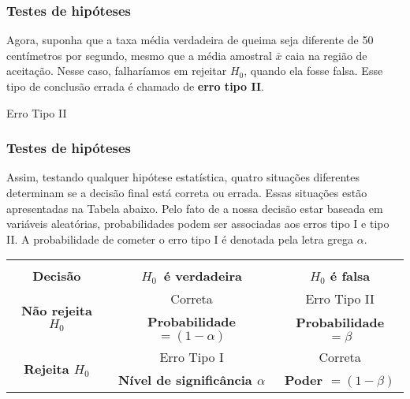 \documentclass[14pt,aspectratio=1610]{beamer}
\begin{document}
\begin{frame}{}
\frametitle{Testes de hipóteses}
\begin{block}{}
\justifying
Agora, suponha que a taxa média verdadeira de queima seja diferente de 50 centímetros por segundo, mesmo que a média amostral $\bar{x}$ caia na região de 
aceitação. Nesse caso, falharíamos em rejeitar $H_{0}$, quando ela fosse falsa. Esse tipo de conclusão errada é chamado de \textbf{erro tipo II}.
\end{block}
\pause
\begin{block}{Erro Tipo II}
\end{block}
\end{frame}

\begin{frame}{}
\frametitle{Testes de hipóteses}
\begin{block}{}
\justifying
Assim, testando qualquer hipótese estatística, quatro situações diferentes determinam se a decisão final está correta ou errada. Essas situações estão apresentadas 
na Tabela abaixo. Pelo fato de a nossa decisão estar baseada em variáveis aleatórias, probabilidades podem ser associadas aos erros tipo I e tipo II. A 
probabilidade de cometer o erro tipo I é denotada pela letra grega $\alpha$.
 \end{block}

\begin{block}{}
\begin{center}
\begin{table}[]
\begin{tabular}{c|c|c}
&&\\
                          \textbf{Decisão}                   &\textbf{$H_{0}\,$ é verdadeira}                         &\textbf{$H_{0}$ é falsa}\\ \hline
 \multirow{2}{*}{\textbf{Não rejeita $H_{0}$}}&Correta                                                               &Erro Tipo II\\
                                                                        &\textbf{Probabilidade $=\left(1-\alpha \right)$} &\textbf{Probabilidade $=\beta$}\\ \hline
\multirow{2}{*}{\textbf{Rejeita $H_{0}$}}       &Erro Tipo I                                                          &  Correta\\
                                                                        &\textbf{Nível de significância $\alpha$}            &\textbf{Poder $=\left( 1-\beta\right)$}\\ \hline
\end{tabular}
\end{table}
\end{center}
\end{block}

\end{frame}
\end{document}
